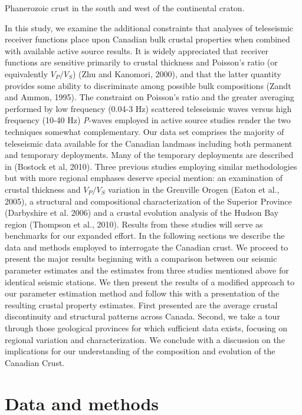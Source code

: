 \documentclass[review]{elsarticle}
\begin{document}
Phanerozoic crust in the south and west of the continental craton.

In this study, we examine the additional constraints that analyses of teleseismic receiver functions place upon Canadian bulk crustal properties when combined with available active source results. It is widely appreciated that receiver functions are sensitive primarily to crustal thickness and Poisson's ratio (or equivalently $V_P/V_S$) (Zhu and Kanomori, 2000), and that the latter quantity provides some ability to discriminate among possible bulk compositions (Zandt and Ammon, 1995). The constraint on Poisson's ratio and the greater averaging performed by low frequency (0.04-3 Hz) scattered teleseismic waves versus high frequency (10-40 Hz) {\it P}-waves employed in active source studies render the two techniques somewhat complementary. Our data set comprises the majority of teleseismic data available for the Canadian landmass including both permanent and temporary deployments. Many of the temporary deployments are described in (Bostock et al, 2010). Three previous studies employing similar methodologies but with more regional emphases deserve special mention: an examination of crustal thickness and $V_P/V_S$ variation in the Grenville Orogen (Eaton et al., 2005), a structural and compositional characterization of the Superior Province (Darbyshire et al. 2006) and a crustal evolution analysis of the Hudson Bay region (Thompson et al., 2010). Results from these studies will serve as benchmarks for our expanded effort. In the following sections we describe the data and methods employed to interrogate the Canadian crust. We proceed to present the major results beginning with a comparison between our seismic parameter estimates and the estimates from three studies mentioned above for identical seismic stations. We then present the results of a modified approach to our parameter estimation method and follow this with a presentation of the resulting crustal property estimates.  First presented are the average crustal discontinuity and structural patterns across Canada. Second, we take a tour through those geological provinces for which sufficient data exists, focusing on regional variation and characterization. We conclude with a discussion on the implications for our understanding of the composition and evolution of the Canadian Crust.



\section{Data and methods}
\end{document}
